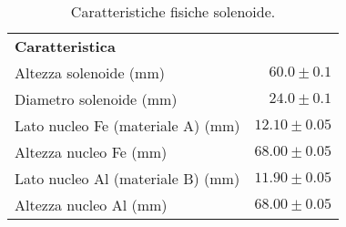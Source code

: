 \squeezetable
\begin{table}[h]
    \begin{ruledtabular}
        \caption{Caratteristiche fisiche solenoide.}
        \label{tab:L_caratt}
        \begin{tabular}{lr}
            \bf{Caratteristica} & \\
            \colrule
            Altezza solenoide (mm)              & $60.0  \pm 0.1 $ \\
            Diametro solenoide (mm)             & $24.0  \pm 0.1 $ \\
            Lato nucleo Fe (materiale A) (mm)   & $12.10 \pm 0.05$ \\
            Altezza nucleo Fe (mm)              & $68.00 \pm 0.05$ \\
            Lato nucleo Al (materiale B) (mm)   & $11.90 \pm 0.05$ \\
            Altezza nucleo Al (mm)              & $68.00 \pm 0.05$ \\
        \end{tabular}
    \end{ruledtabular}
\end{table}